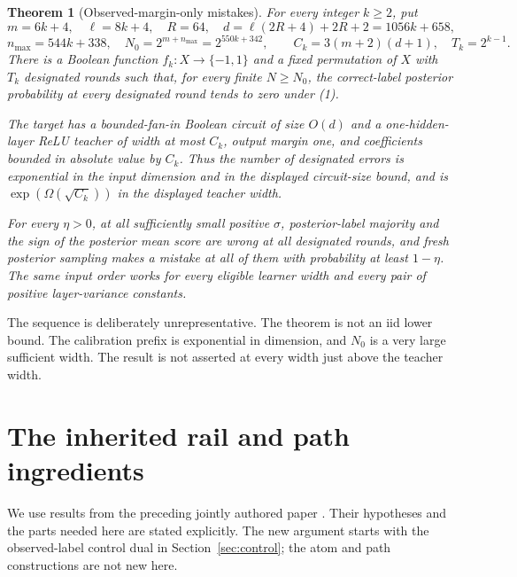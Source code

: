 \documentclass[11pt]{article}
\newtheorem{theorem}{Theorem}\newtheorem{lemma}[theorem]{Lemma}
\begin{document}
\begin{theorem}[Observed-margin-only mistakes]\label{thm:main}
For every integer $k\ge2$, put
\[
 m=6k+4,\quad \ell=8k+4,\quad R=64,\quad
 d=\ell(2R+4)+2R+2=1056k+658,
\]
\[
 n_{\max}=544k+338,\quad N_0=2^{m+n_{\max}}=2^{550k+342},
 \qquad C_k=3(m+2)(d+1),\quad T_k=2^{k-1}.
\]
There is a Boolean function $f_k:X\to\{-1,1\}$ and a fixed permutation
of $X$ with $T_k$ designated rounds such that, for every finite
$N\ge N_0$, the correct-label posterior probability at every designated
round tends to zero under (1).

The target has a bounded-fan-in Boolean circuit of size $O(d)$ and a
one-hidden-layer ReLU teacher of width at most $C_k$, output margin one,
and coefficients bounded in absolute value by $C_k$. Thus the number
of designated errors is exponential in the input dimension and in the
displayed circuit-size bound, and is
$\exp(\Omega(\sqrt{C_k}))$ in the displayed teacher width.

For every $\eta>0$, at all sufficiently small positive $\sigma$,
posterior-label majority and the sign of the posterior mean score are
wrong at all designated rounds, and fresh
posterior sampling makes a mistake at all of them with probability at
least $1-\eta$. The same input order works for every eligible learner
width and every pair of positive layer-variance constants.
\end{theorem}

The sequence is deliberately unrepresentative. The theorem is not an
iid lower bound. The calibration prefix is exponential in dimension,
and $N_0$ is a very large sufficient width. The result is not asserted
at every width just above the teacher width.

\section{The inherited rail and path ingredients}
We use results from the preceding jointly authored paper \cite{shared}.
Their hypotheses and the parts needed here are stated explicitly.
The new argument starts with the observed-label control dual in
Section~\ref{sec:control}; the atom and path constructions are not new here.
\end{document}
